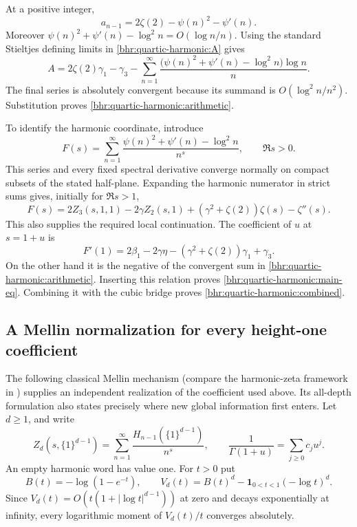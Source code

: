At a positive integer,
\[
 a_{n-1}=2\zeta(2)-\psi(n)^2-\psi'(n).
\]
Moreover $\psi(n)^2+\psi'(n)-\log^2n=O(\log n/n)$.
Using the standard Stieltjes defining limits in
\eqref{bhr:quartic-harmonic:A} gives
\[
 A=2\zeta(2)\gamma_1-\gamma_3
   -\sum_{n=1}^{\infty}
          \frac{\bigl(\psi(n)^2+\psi'(n)-\log^2n\bigr)\log n}{n}.
\]
The final series is absolutely convergent because its summand is
$O(\log^2n/n^2)$. Substitution proves
\eqref{bhr:quartic-harmonic:arithmetic}.

To identify the harmonic coordinate, introduce
\[
 F(s)=\sum_{n=1}^{\infty}
    \frac{\psi(n)^2+\psi'(n)-\log^2n}{n^s},\qquad\Re s>0.
\]
This series and every fixed spectral derivative converge normally
on compact subsets of the stated half-plane. Expanding the harmonic
numerator in strict sums gives, initially for $\Re s>1$,
\begin{equation}
 F(s)=2Z_3(s,1,1)-2\gamma Z_2(s,1)
                   +(\gamma^2+\zeta(2))\zeta(s)-\zeta''(s).
 \label{bhr:quartic-harmonic:deformation}
\end{equation}
This also supplies the required local continuation. The coefficient
of $u$ at $s=1+u$ is
\[
 F'(1)=2\beta_1-2\gamma\eta
                 -(\gamma^2+\zeta(2))\gamma_1+\gamma_3.
\]
On the other hand it is the negative of the convergent sum in
\eqref{bhr:quartic-harmonic:arithmetic}. Inserting this relation proves
\eqref{bhr:quartic-harmonic:main-eq}. Combining it with the cubic bridge
proves \eqref{bhr:quartic-harmonic:combined}.

\subsection{A Mellin normalization for every height-one coefficient}

The following classical Mellin mechanism (compare the harmonic-zeta framework in \cite{bhr:Kargin}) supplies an independent
realization of the coefficient used above. Its all-depth formulation
also states precisely where new global information first enters.
Let $d\ge1$, and write
\[
 Z_d(s,\{1\}^{d-1})
   =\sum_{n=1}^{\infty}\frac{H_{n-1}(\{1\}^{d-1})}{n^s},
 \qquad
 \frac1{\Gamma(1+u)}=\sum_{j\ge0}c_ju^j.
\]
An empty harmonic word has value one. For $t>0$ put
\[
 B(t)=-\log(1-e^{-t}),\qquad
 V_d(t)=B(t)^d-\mathbf1_{0<t<1}(-\log t)^d.
\]
Since $V_d(t)=O(t(1+|\log t|^{d-1}))$ at zero and decays
exponentially at infinity, every logarithmic moment of $V_d(t)/t$
converges absolutely.

